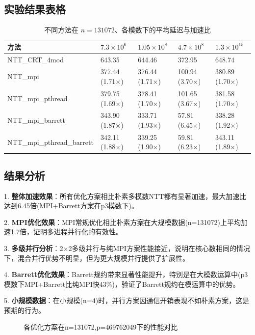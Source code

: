 \documentclass[a4paper]{article}
\begin{document}
\subsection{实验结果表格}
\begin{table}[H]
	\centering
	\caption{不同方法在 \(n=131072\)、各模数下的平均延迟与加速比}
	\begin{tabularx}{\textwidth}{@{}lXXXX@{}}
		\toprule
		方法 & \(7.3\times10^6\) & \(1.05\times10^8\) & \(4.7\times10^8\) & \(1.3\times10^{15}\) \\
		\midrule
		NTT\_CRT\_4mod & 643.35 & 644.46 & 372.95 & 648.74 \\
		NTT\_mpi & 377.44 (1.71×) & 376.44 (1.71×) & 100.94 (3.70×) & 380.89 (1.70×) \\
		NTT\_mpi\_pthread & 379.75 (1.69×) & 378.41 (1.70×) & 101.65 (3.67×) & 381.58 (1.70×) \\
		NTT\_mpi\_barrett & 343.90 (1.87×) & 333.71 (1.93×) & 57.81 (6.45×) & 338.28 (1.92×) \\
		NTT\_mpi\_pthread\_barrett & 342.11 (1.88×) & 339.25 (1.90×) & 59.81 (6.23×) & 343.11 (1.89×) \\
		\bottomrule
	\end{tabularx}
\end{table}
\subsection{结果分析}
1. \textbf{整体加速效果}：所有优化方案相比朴素多模数NTT都有显著加速，最大加速比达到6.45倍(MPI+Barrett方案在p3模数下)。

2. \textbf{MPI优化效果}：MPI常规优化相比朴素方案在大规模数据(n=131072)上平均加速1.7倍，证明多进程并行化的有效性。

3. \textbf{多级并行分析}：2×2多级并行与纯MPI方案性能接近，说明在核心数相同的情况下，混合并行优势不明显，但为更大规模并行提供了扩展性。

4. \textbf{Barrett优化效果}：Barrett规约带来显著性能提升，特别是在大模数运算中(p3模数下MPI+Barrett比纯MPI快43\%)，验证了Barrett规约在模运算中的优势。

5. \textbf{小规模数据}：在小规模(n=4)时，并行方案因通信开销表现不如朴素方案，这是预期的行为。

\begin{figure}[h]
	\centering
	\caption{各优化方案在n=131072,p=469762049下的性能对比}
\end{figure}
\end{document}
